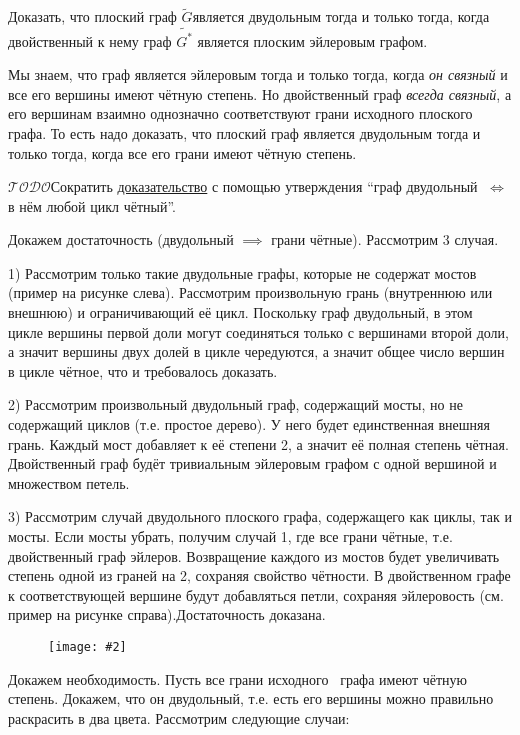 \documentclass[a4paper,12pt]{article}
\numberwithin{figure}{section}
\def\IFF{$\;\Longleftrightarrow\;$}
\def\TODO{\guillemotleft$\mathcal{TODO}$\guillemotright\textellipsis}
\def\Gwave{$\tilde{G}$}
\newcommand\CenterFigure[2]{
	\begin{figure}[H]
		\centering
		\texttt{[image: \#2]}
	\end{figure}
}
\begin{document}
\begin{problem}
	Доказать, что плоский граф \Gwave является двудольным тогда и только тогда, когда двойственный к нему граф $\tilde{G^*}$ является плоским эйлеровым графом.
\end{problem}

\begin{solution}
	Мы знаем, что граф является эйлеровым тогда и только тогда, когда \textit{он связный} и все его вершины имеют чётную степень. Но двойственный граф \textit{всегда связный}, а его вершинам взаимно однозначно соответствуют грани исходного плоского графа. То есть надо доказать, что плоский граф является двудольным тогда и только тогда, когда все его грани имеют чётную степень.
	
	\TODO Сократить \href{https://stepik.org/lesson/12345/step/8}{доказательство} с помощью утверждения ``граф двудольный \IFF в нём любой цикл чётный''.

	Докажем достаточность (двудольный $\implies$ грани чётные). Рассмотрим 3 случая.
	
	1) Рассмотрим только такие двудольные графы, которые не содержат мостов (пример на рисунке слева). Рассмотрим произвольную грань (внутреннюю или внешнюю) и ограничивающий её цикл. Поскольку граф двудольный, в этом цикле вершины первой доли могут соединяться только с вершинами второй доли, а значит вершины двух долей в цикле чередуются, а значит общее число вершин в цикле чётное, что и требовалось доказать.
	
	2) Рассмотрим произвольный двудольный граф, содержащий мосты, но не содержащий циклов (т.е. простое дерево). У него будет единственная внешняя грань. Каждый мост добавляет к её степени 2, а значит её полная степень чётная. Двойственный граф будёт тривиальным эйлеровым графом с одной вершиной и множеством петель.

	3) Рассмотрим случай двудольного плоского графа, содержащего как циклы, так и мосты. Если мосты убрать, получим случай 1, где все грани чётные, т.е. двойственный граф эйлеров. Возвращение каждого из мостов будет увеличивать степень одной из граней на 2, сохраняя свойство чётности. В двойственном графе к соответствующей вершине будут добавляться петли, сохраняя эйлеровость (см. пример на рисунке справа).Достаточность доказана.

	\CenterFigure{8cm}{flat-is-bipartite-iff-dual-is-euler.png}

	Докажем необходимость. Пусть все грани исходного  графа имеют чётную степень. Докажем, что он двудольный, т.е. есть его вершины можно правильно раскрасить в два цвета. Рассмотрим следующие случаи:
	

\end{solution}
\end{document}
